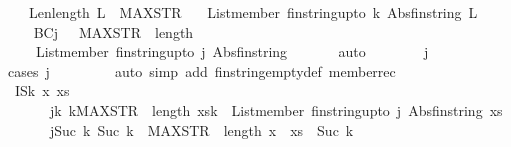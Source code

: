 \begin{isabellebody}
\ \ \ Len{\isacharcolon}{\isachardoublequoteopen}length\ L\ {\isasymle}\ MAX{\isacharunderscore}STR{\isachardoublequoteclose}\isanewline
\ \ \ {\isachardoublequoteopen}List{\isachardot}member\ {\isacharparenleft}fin{\isacharunderscore}string{\isacharunderscore}upto\ k{\isacharparenright}\ {\isacharparenleft}Abs{\isacharunderscore}fin{\isacharunderscore}string\ L{\isacharparenright}{\isachardoublequoteclose}\isanewline
%
\isadelimproof
%
\endisadelimproof
%
\isatagproof
{}\isamarkupfalse%
\ {\isacharminus}\ \isanewline
\ \ \isamarkupfalse%
\ BC{\isacharcolon}{\isachardoublequoteopen}{\isasymforall}j{\isasymge}{}{\isachardot}\ {}\ {\isasymle}\ MAX{\isacharunderscore}STR\ {\isasymlongrightarrow}\ length\ {\isacharbrackleft}{\isacharbrackright}\ {\isacharequal}\ {}\ {\isasymlongrightarrow}\ \isanewline
\ \ \ \ List{\isachardot}member\ {\isacharparenleft}fin{\isacharunderscore}string{\isacharunderscore}upto\ j{\isacharparenright}\ {\isacharparenleft}Abs{\isacharunderscore}fin{\isacharunderscore}string\ {\isacharbrackleft}{\isacharbrackright}{\isacharparenright}{\isachardoublequoteclose}\ \isanewline
\ \ \ \ \isamarkupfalse%
{\isacharparenleft}auto{\isacharparenright}\ \isanewline
\ \ \ \ \isamarkupfalse%
\ \ j\ \isanewline
\ \ \ \ \ \ \isamarkupfalse%
{\isacharparenleft}cases\ j{\isacharparenright}\ \isanewline
\ \ \ \ \ \ \isamarkupfalse%
\ {\isacharparenleft}auto\ simp\ add{\isacharcolon}\ fin{\isacharunderscore}string{\isacharunderscore}empty{\isacharunderscore}def\ member{\isacharunderscore}rec{\isacharparenright}\ \isanewline
\ \ \ \ \isamarkupfalse%
\isanewline
\ \ \isamarkupfalse%
\ IS{\isacharcolon}{\isachardoublequoteopen}{\isacharparenleft}{\isasymAnd}k\ x\ xs{\isachardot}\isanewline
\ \ \ \ \ \ {\isasymforall}j{\isasymge}k{\isachardot}\ k{\isasymle}MAX{\isacharunderscore}STR\ {\isasymlongrightarrow}\ length\ xs{\isacharequal}k\ {\isasymlongrightarrow}\ List{\isachardot}member\ {\isacharparenleft}fin{\isacharunderscore}string{\isacharunderscore}upto\ j{\isacharparenright}\ {\isacharparenleft}Abs{\isacharunderscore}fin{\isacharunderscore}string\ xs{\isacharparenright}{\isasymLongrightarrow}\isanewline
\ \ \ \ \ \ {\isasymforall}j{\isasymge}Suc\ k{\isachardot}\ Suc\ k\ {\isasymle}\ MAX{\isacharunderscore}STR\ {\isasymlongrightarrow}\ length\ {\isacharparenleft}x\ {\isacharhash}\ xs{\isacharparenright}\ {\isacharequal}\ Suc\ k\ \isanewline

\end{isabellebody}
